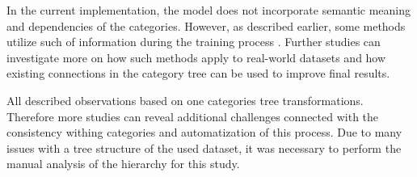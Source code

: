 In the current implementation, the model does not incorporate semantic meaning and dependencies of the categories. However, as described earlier, some methods utilize such of information during the training process \cite{Wang2016CNN-RNN:Classification}. Further studies can investigate more on how such methods apply to real-world datasets and how existing connections in the category tree can be used to improve final results.

All described observations based on one categories tree transformations. Therefore more studies can reveal additional challenges connected with the consistency withing categories and automatization of this process. Due to many issues with a tree structure of the used dataset, it was necessary to perform the manual analysis of the hierarchy for this study. 


